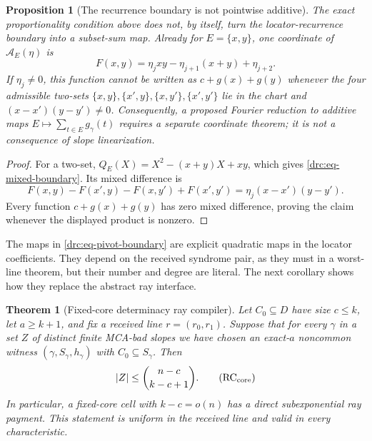 \documentclass[11pt,a4paper]{amsart}
\numberwithin{equation}{section}
\newtheorem{theorem}{Theorem}[section]
\newtheorem{proposition}[proposition]{Proposition}
\theoremstyle{remark}
\newcommand{\abs}[1]{\lvert #1\rvert}
\begin{document}
\begin{proposition}[The recurrence boundary is not pointwise additive]
\label{drc:prop-recurrence-nonadditive}
The exact proportionality condition above does not, by itself, turn the
locator-recurrence boundary into a subset-sum map.  Already for
\(E=\{x,y\}\), one coordinate of \(\mathcal A_E(\eta)\) is
\[
 F(x,y)=\eta_jxy-\eta_{j+1}(x+y)+\eta_{j+2}.       \tag{DRC3}
\label{drc:eq-mixed-boundary}
\]
If \(\eta_j\ne0\), this function cannot be written as
\(c+g(x)+g(y)\) whenever the four admissible two-sets
\(\{x,y\},\{x',y\},\{x,y'\},\{x',y'\}\) lie in the chart and
\((x-x')(y-y')\ne0\).
Consequently, a proposed Fourier reduction to additive maps
\(E\mapsto\sum_{t\in E}g_\gamma(t)\) requires a separate coordinate
theorem; it is not a consequence of slope linearization.
\end{proposition}

\begin{proof}
For a two-set,
\(Q_E(X)=X^2-(x+y)X+xy\), which gives
\eqref{drc:eq-mixed-boundary}.  Its mixed difference is
\[
 F(x,y)-F(x',y)-F(x,y')+F(x',y')
   =\eta_j(x-x')(y-y').
\]
Every function \(c+g(x)+g(y)\) has zero mixed difference, proving the
claim whenever the displayed product is nonzero.
\end{proof}

The maps in \eqref{drc:eq-pivot-boundary} are explicit quadratic maps in
the locator coefficients.  They depend on the received syndrome pair, as
they must in a worst-line theorem, but their number and degree are literal.
The next corollary shows how they replace the abstract ray interface.


\begin{theorem}[Fixed-core determinacy ray compiler]
\label{thm:fixed-core-determinacy-ray}
Let \(C_0\subseteq D\) have size \(c\le k\), let \(a\ge k+1\), and
fix a received line \(r=(r_0,r_1)\).  Suppose that for every
\(\gamma\) in a set \(Z\) of distinct finite MCA-bad slopes we have
chosen an exact-\(a\) noncommon witness
\((\gamma,S_\gamma,h_\gamma)\) with \(C_0\subseteq S_\gamma\).  Then
\[
             \abs Z\le \binom{n-c}{k-c+1}.          \tag{RC$_{\rm core}$}
\]
In particular, a fixed-core cell with \(k-c=o(n)\) has a direct
subexponential ray payment.  This statement is uniform in the received
line and valid in every characteristic.
\end{theorem}
\end{document}

